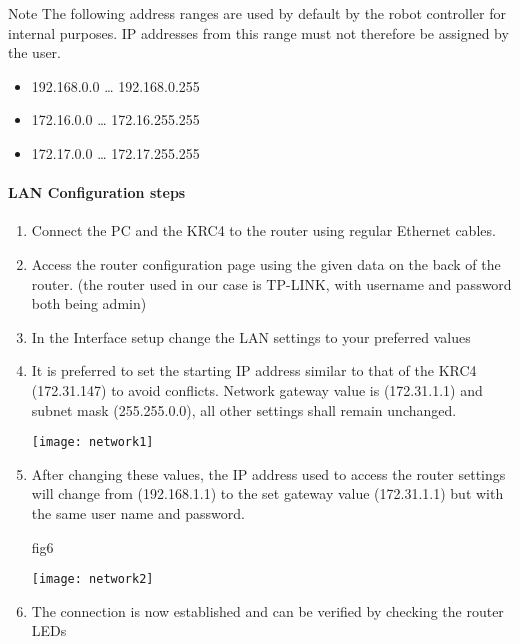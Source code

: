           \begin{mynotebox}{Note}
            The following address ranges are used by default by the
            robot controller for internal purposes. IP addresses from
            this range must not therefore be assigned by the user.
            \begin{itemize}
                \item 192.168.0.0 … 192.168.0.255
                \item 172.16.0.0 … 172.16.255.255
                \item 172.17.0.0 … 172.17.255.255
            \end{itemize}
        \end{mynotebox}
        
			
			\paragraph{LAN Configuration steps}
			\begin{enumerate}
				\item Connect the PC and the KRC4 to the router using regular Ethernet cables.
				\item Access the router configuration page using the given data on the back of the router. (the router used in our case is TP-LINK, with username and password both being admin)
				\item In the Interface setup change the LAN settings to your preferred values
				\item It is preferred to set the starting IP address similar to that of the KRC4 (172.31.147) to avoid conflicts. Network gateway value is (172.31.1.1) and subnet mask (255.255.0.0), all other settings shall remain unchanged.
				
				\begin{center}
					\texttt{[image: network1]}
				\end{center}
				
		
				
				\item After changing these values, the IP address used to access the router settings will change from (192.168.1.1) to the set gateway value (172.31.1.1) but with the same user name and password.
				
				fig6
				
				\begin{center}
					\texttt{[image: network2]}
				\end{center}
				
				\item The connection is now established and can be verified by checking the router LEDs
			\end{enumerate}
		
